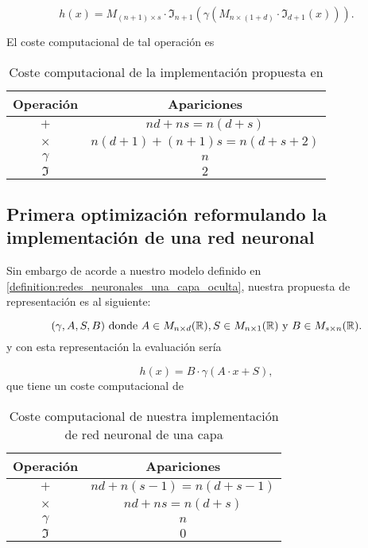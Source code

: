 \begin{equation}
    h(x) =  M_{(n+1) \times s} \cdot
    \mathfrak{I}_{n+1}\left(
         \gamma \left( 
             M_{n \times (1+d)} 
            \cdot 
            \mathfrak{I}_{d+1}(x)
        \right)
    \right).
\end{equation}

El coste computacional de tal operación es 
\begin{table}[h]
    \begin{center}
    \begin{tabular}{| c | c |}
    \hline
    Operación & Apariciones  \\ \hline
    $+$ & $n d+n s = n(d+s)$  \\
    $\times$ & $n(d+1)+(n+1)s = n(d+s+2)$  \\
    $\gamma$ & $n$  \\
    $\mathfrak{I}$ & $2$  \\
    \hline
    \end{tabular}
    \caption{Coste computacional de la implementación propuesta en \cite{MostafaLearningFromData}}
    \label{tab:coste computacional de la implementación de Mustafa}
    \end{center}
\end{table}

\subsection*{Primera optimización reformulando la implementación de una red neuronal}

Sin embargo de acorde a nuestro modelo definido en \ref{definition:redes_neuronales_una_capa_oculta}, nuestra propuesta de representación es al siguiente: 

\begin{equation}
    (\gamma, A, S, B) 
    \text{ donde } 
    A \in M_{n \times d}(\mathbb{R}), 
    S\in M_{n \times 1}(\mathbb{R}) 
    \text{ y }
    B \in M_{s \times n}(\mathbb{R}).
\end{equation}
y con esta representación la evaluación sería

\begin{equation}
    h(x) =  B \cdot
        \gamma \left( 
            A
            \cdot 
            x
            + S
        \right),
\end{equation}
que tiene un coste computacional de 
\begin{table}[h]
    \begin{center}
    \begin{tabular}{| c | c |}
    \hline
    Operación & Apariciones  \\ \hline
    $+$ & $n d+n(s-1) = n(d+s-1)$  \\
    $\times$ & $n d+n s = n(d+s)$  \\
    $\gamma$ & $n$  \\
    $\mathfrak{I}$ & $0$  \\
    \hline
    \end{tabular}
    \caption{Coste computacional de nuestra implementación de red neuronal de una capa}
    \label{tab:coste computacional nuestr modelo red neuronal}
    \end{center}
\end{table}

